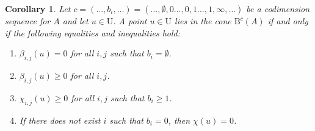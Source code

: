 \documentclass[12pt]{amsart}
\newtheorem{cor}[lemma]{Corollary}
\theoremstyle{definition}
\theoremstyle{remark}
\newcommand{\UU}{\mathrm{U}}
\newcommand{\cc}{c}
\newcommand{\nothing}{\emptyset}
\newcommand{\BBQ}{\mathrm{B}}
\begin{document}
\begin{cor}\label{cor:dualconeA refined}
Let $\cc = (\dots,b_{i},\dots) = (\dots,\nothing,0\dots,0,1\dots,1,\infty, \dots)$ be a codimension sequence for $A$ and let $u\in \UU$.
A point $u\in \UU$ lies in the cone $\BBQ^{\cc}(A)$ if and only if the following equalities and inequalities hold:
\begin{enumerate}
	\item $\beta_{i,j}(u)=0$ for all $i,j$ such that $b_i=\nothing$.
	\item $\beta_{i,j}(u)\geq 0$ for all $i,j$.
	\item  $\chi_{i,j}(u)\geq 0$ for all $i,j$ such that $b_i\geq 1$.
	\item If there does not exist $i$ such that $b_i=0$, then $\chi(u)=0$.
\end{enumerate}
\end{cor}
\end{document}
